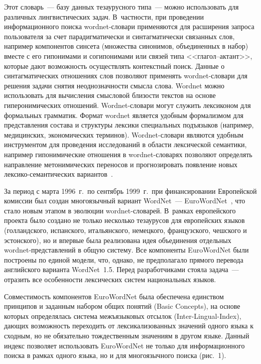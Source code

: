\begin{multicols}{2}
     Этот словарь~--- базу данных тезаурусного типа~--- можно использовать 
для различных лингвистических задач. В~частности, при проведении 
информационного поиска wordnet-сло\-ва\-ри применяются для расширения 
запроса пользователя за счет парадигматически и синтагматически 
связанных слов, например компонентов синсета (множества синонимов, 
объединенных в набор) вместе с его гипонимами и согипонимами или связей 
типа <<гла\-гол--ак\-тант>>, которые дают возможность осуществлять 
контекстный поиск. Данные о синтагматических отношениях слов позволяют 
применять wordnet-сло\-ва\-ри для решения задачи снятия неоднозначности 
смысла слова. Wordnet можно использовать для вычисления смысловой 
близости текстов на основе гиперонимических отношений. 
     Wordnet-сло\-ва\-ри могут служить лексиконом для формальных 
грамматик. Формат wordnet является удобным формализмом для 
представления состава и структуры лексики специальных подъязыков 
(например, медицинских, экономических терминов). Wordnet-сло\-ва\-ри 
являются удобным инструментом для проведения исследований в области 
лексической семантики, например гипонимические отношения в 
     wordnet-сло\-ва\-рях позволяют определять направление 
метонимических переносов и прогнозировать появление новых 
     лек\-си\-ко-се\-ман\-ти\-че\-ских вариантов~\cite{13-ko}.

     За период с марта 1996~г.\ по сентябрь 1999~г.\ при финансировании 
Европейской комиссии был создан многоязычный вариант WordNet~--- 
EuroWordNet~\cite{14-ko}, что стало новым этапом в эволюции word\-net-сло\-ва\-рей. 
В~рамках европейского проекта было создано не только несколько 
тезаурусов для европейских языков (голландского, испан\-ского, италь\-ян\-ско\-го, 
немецкого, французского, чешско\-го и эстонского), но и впервые была 
реализована идея объединения отдельных wordnet-пред\-став\-ле\-ний в 
общую систему. Все компоненты EuroWordNet были построены по единой 
модели, что, \mbox{однако}, не предполагало прямого перевода анг\-лий\-ско\-го 
варианта WordNet~1.5. Перед разработчиками стояла задача~--- отразить все 
особенности лексических систем национальных языков. 

Со\-вмес\-ти\-мость 
компонентов EuroWordNet была обеспечена \mbox{единством} принципов и 
заданным набором общих понятий (Basic Concepts), на основе которых 
определялась система межъязыковых отсылок (Inter-Lingual-Index), дающих 
возможность переходить от лексикализованных значений одного языка к 
сходным, но не обязательно тождественным значениям в другом языке. 
Данный индекс позволяет использовать EuroWordNet не только для 
информационного поиска в рамках одного языка, но и для многоязычного 
поиска (рис.~1).
     

\end{multicols}
